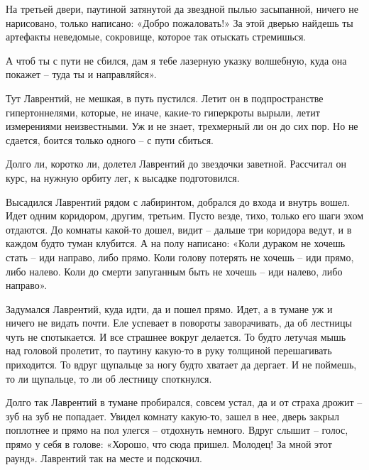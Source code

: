 \documentclass[ebook,oneside,final,openright]{memoir}
\begin{document}
\par
На третьей двери, паутиной затянутой да звездной пылью засыпанной, ничего не нарисовано, только написано: «Добро пожаловать!» За этой дверью найдешь ты артефакты неведомые, сокровище, которое так отыскать стремишься.\par
\par
А чтоб ты с пути не сбился, дам я тебе лазерную указку волшебную, куда она покажет – туда ты и направляйся».\par
\par
Тут Лаврентий, не мешкая, в путь пустился. Летит он в подпространстве гипертоннелями, которые, не иначе, какие-то гиперкроты вырыли, летит измерениями неизвестными. Уж и не знает, трехмерный ли он до сих пор. Но не сдается, боится только одного – с пути сбиться.\par
\par
Долго ли, коротко ли, долетел Лаврентий до звездочки заветной. Рассчитал он курс, на нужную орбиту лег, к высадке подготовился.\par
\par
Высадился Лаврентий рядом с лабиринтом, добрался до входа и внутрь вошел. Идет одним коридором, другим, третьим. Пусто везде, тихо, только его шаги эхом отдаются. До комнаты какой-то дошел, видит – дальше три коридора ведут, и в каждом будто туман клубится. А на полу написано: «Коли дураком не хочешь стать – иди направо, либо прямо. Коли голову потерять не хочешь – иди прямо, либо налево. Коли до смерти запуганным быть не хочешь – иди налево, либо направо».\par
\par
Задумался Лаврентий, куда идти, да и пошел прямо. Идет, а в тумане уж и ничего не видать почти. Еле успевает в повороты заворачивать, да об лестницы чуть не спотыкается. И все страшнее вокруг делается. То будто летучая мышь над головой пролетит, то паутину какую-то в руку толщиной перешагивать приходится. То вдруг щупальце за ногу будто хватает да дергает. И не поймешь, то ли щупальце, то ли об лестницу споткнулся.\par
\par
Долго так Лаврентий в тумане пробирался, совсем устал, да и от страха дрожит – зуб на зуб не попадает. Увидел комнату какую-то, зашел в нее, дверь закрыл поплотнее и прямо на пол улегся – отдохнуть немного. Вдруг слышит – голос, прямо у себя в голове: «Хорошо, что сюда пришел. Молодец! За мной этот раунд». Лаврентий так на месте и подскочил. \par
\par
\end{document}
